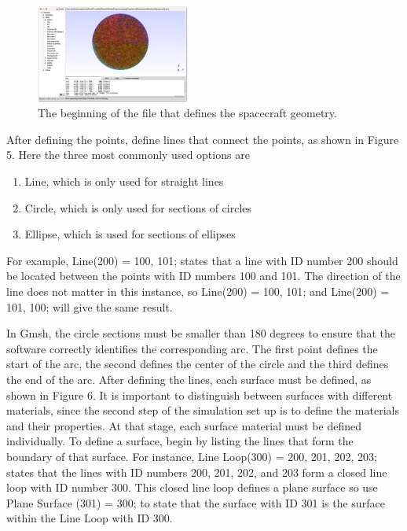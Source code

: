 \documentclass[a4paper, 11pt]{article}
\begin{document}
\begin{figure}[!ht]
    \centering
    \includegraphics[width=0.45\textwidth]{fig4.jpg}
    \caption{The beginning of the file that defines the spacecraft geometry.}
\end{figure}

After defining the points, define lines that connect the points, as shown in Figure 5. Here the three most commonly used options are
\begin{enumerate}
    \item Line, which is only used for straight lines
    \item Circle, which is only used for sections of circles
    \item Ellipse, which is used for sections of ellipses
\end{enumerate}
For example, Line(200) = {100, 101}; states that a line with ID number 200 should be located between the points with ID numbers 100 and 101. The direction of the line does not matter in this instance, so Line(200) = {100, 101}; and Line(200) = {101, 100}; will give the same result.\par
In Gmsh, the circle sections must be smaller than 180 degrees to ensure that the software correctly identifies the corresponding arc. The first point defines the start of the arc, the second defines the center of the circle and the third defines the end of the arc. After defining the lines, each surface must be defined, as shown in Figure 6. It is important to distinguish between surfaces with different materials, since the second step of the simulation set up is to define the materials and their properties. At that stage, each surface material must be defined individually. To define a surface, begin by listing the lines that form the boundary of that surface. For instance, Line Loop(300) = {200, 201, 202, 203}; states that the lines with ID numbers 200, 201, 202, and 203 form a closed line loop with ID number 300. This closed line loop defines a plane surface so use Plane Surface (301) = {300}; to state that the surface with ID 301 is the surface within the Line Loop with ID 300.
\end{document}

